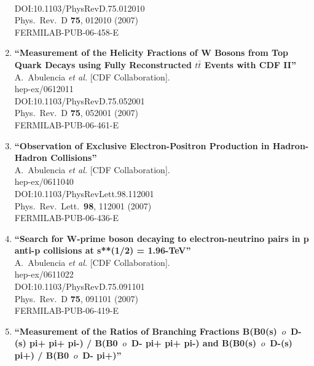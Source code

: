 \documentclass{article}
\begin{document}
\begin{enumerate}
  \\{}DOI:10.1103/PhysRevD.75.012010
  \\{}Phys.\ Rev.\ D {\bf 75}, 012010 (2007)
  \\{}FERMILAB-PUB-06-458-E
\item%
{\bf ``Measurement of the Helicity Fractions of W Bosons from Top Quark Decays using Fully Reconstructed \boldmath${t\bar{t}}$ Events with CDF II''}
  \\{}A.~Abulencia {\it et al.} [CDF Collaboration].
  \\{}hep-ex/0612011
  \\{}DOI:10.1103/PhysRevD.75.052001
  \\{}Phys.\ Rev.\ D {\bf 75}, 052001 (2007)
  \\{}FERMILAB-PUB-06-461-E
\item%
{\bf ``Observation of Exclusive Electron-Positron Production in Hadron-Hadron Collisions''}
  \\{}A.~Abulencia {\it et al.} [CDF Collaboration].
  \\{}hep-ex/0611040
  \\{}DOI:10.1103/PhysRevLett.98.112001
  \\{}Phys.\ Rev.\ Lett.\  {\bf 98}, 112001 (2007)
  \\{}FERMILAB-PUB-06-436-E
\item%
{\bf ``Search for W-prime boson decaying to electron-neutrino pairs in p anti-p collisions at s**(1/2) = 1.96-TeV''}
  \\{}A.~Abulencia {\it et al.} [CDF Collaboration].
  \\{}hep-ex/0611022
  \\{}DOI:10.1103/PhysRevD.75.091101
  \\{}Phys.\ Rev.\ D {\bf 75}, 091101 (2007)
  \\{}FERMILAB-PUB-06-419-E
\item%
{\bf ``Measurement of the Ratios of Branching Fractions B(B0(s) $\,	o\,$ D-(s) pi+ pi+ pi-) / B(B0 $\,	o\,$ D- pi+ pi+ pi-) and B(B0(s) $\,	o\,$ D-(s) pi+) / B(B0 $\,	o\,$ D- pi+)''}

\end{enumerate}
\end{document}
